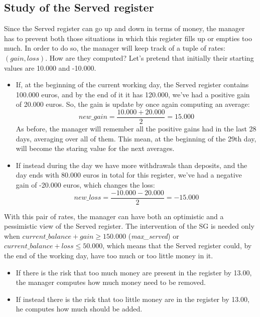 \documentclass{article}
\begin{document}
\subsection{Study of the Served register}
Since the Served register can go up and down in terms of money, the manager has to prevent both those situations in which this register fills up or empties too much. In order to do so, the manager will keep track of a tuple of rates: $(gain, loss)$. How are they computed?
Let's pretend that initially their starting values are 10.000 and -10.000.
\begin{itemize}
    \item If, at the beginning of the current working day, the Served register contains 100.000 euros, and by the end of it it has 120.000, we've had a positive gain of 20.000 euros. So, the gain is update by once again computing an average:
    \begin{equation*}
        new\_gain = \frac{10.000 + 20.000}{2} = 15.000
    \end{equation*}
    As before, the manager will remember all the positive gains had in the last 28 days, averaging over all of them. This mean, at the beginning of the 29th day, will become the staring value for the next averages.
    \item If instead during the day we have more withdrawals than deposits, and the day ends with 80.000 euros in total for this register, we've had a negative gain of -20.000 euros, which changes the loss:
    \begin{equation*}
        new\_loss = \frac{-10.000 - 20.000}{2} = -15.000
    \end{equation*}
\end{itemize}
With this pair of rates, the manager can have both an optimistic and a pessimistic view of the Served register. The intervention of the SG is needed only when $current\_balance + gain \geq 150.000 $ (\emph{max\_served}) or $current\_balance + loss \leq 50.000$, which means that the Served register could, by the end of the working day, have too much or too little money in it.
\begin{itemize}
    \item If there is the risk that too much money are present in the register by 13.00, the manager computes how much money need to be removed.
    \item If instead there is the risk that too little money are in the register by 13.00, he computes how much should be added.
\end{itemize}
\end{document}

